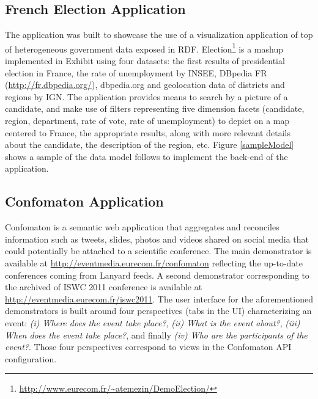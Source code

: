 \documentclass[a4paper,11pt]{report}
\begin{document}
\subsection{French Election Application}
The application was built to showcase the use of a visualization application of top of heterogeneous government data exposed in RDF.
Election\footnote{\url{http://www.eurecom.fr/~atemezin/DemoElection/}} is a mashup implemented in Exhibit using four datasets: the first results of presidential election in France, the rate of unemployment by INSEE,
DBpedia FR (\url{http://fr.dbpedia.org/}), dbpedia.org and geolocation data of districts and regions by IGN. The application provides means to search by a picture of 
a candidate, and make use of filters representing five dimension facets (candidate, region, department, rate of vote, rate of unemployment) to depict on 
a map centered to France, the appropriate results, along with more relevant details about the candidate, the description of the region, etc. Figure \ref{sampleModel} shows 
a sample of the data model follows to implement the back-end of the application.   


\subsection{Confomaton Application}
Confomaton \cite{khrouf-eswc2012} is a semantic web application that aggregates and reconciles information such as tweets, slides, photos and videos shared on social media that could potentially be attached to a scientific conference. The main demonstrator is available at \url{http://eventmedia.eurecom.fr/confomaton} reflecting the up-to-date conferences coming from Lanyard feeds. A second demonstrator corresponding to the archived of ISWC 2011 conference \cite{khrouf-ramms12} is available at \url{http://eventmedia.eurecom.fr/iswc2011}. The user interface for the aforementioned demonstrators is built around four perspectives (tabs in the UI) characterizing an event: \textit{(i) Where does the event take place?}, \textit{(ii) What is the event about?},  \textit{(iii) When does the event take place?}, and finally \textit{(iv) Who are the participants of the event?}. Those four perspectives correspond to views in the Confomaton API configuration. 

\end{document}
